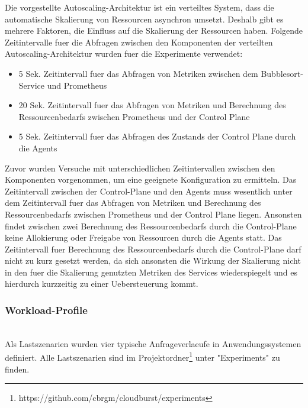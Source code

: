 \documentclass[runningheads]{llncs}
\begin{document}
Die vorgestellte Autoscaling-Architektur ist ein verteiltes System, dass die automatische Skalierung von Ressourcen asynchron umsetzt. Deshalb gibt es mehrere Faktoren, die Einfluss auf die Skalierung der Ressourcen haben. Folgende Zeitintervalle fuer die Abfragen zwischen den Komponenten der verteilten Autoscaling-Architektur wurden fuer die Experimente verwendet: 

 \begin{itemize}
	\item  5 Sek. Zeitintervall fuer das Abfragen von Metriken zwischen dem Bubblesort-Service und Prometheus
	\item  20 Sek. Zeitintervall fuer das Abfragen von Metriken und Berechnung des Ressourcenbedarfs zwischen Prometheus und der Control Plane
	\item  5 Sek. Zeitintervall fuer das Abfragen des Zustands der Control Plane durch die Agents
\end{itemize}

Zuvor wurden Versuche mit unterschiedlichen Zeitintervallen zwischen den Komponenten vorgenommen, um eine geeignete Konfiguration zu ermitteln.
Das Zeitintervall zwischen der Control-Plane und den Agents muss wesentlich unter dem Zeitintervall fuer das Abfragen von Metriken und Berechnung des Ressourcenbedarfs zwischen Prometheus und der Control Plane liegen. Ansonsten findet zwischen zwei Berechnung des Ressourcenbedarfs durch die Control-Plane keine Allokierung oder Freigabe von Ressourcen durch die Agents statt. Das Zeitintervall fuer Berechnung des Ressourcenbedarfs durch die Control-Plane darf nicht zu kurz gesetzt werden, da sich ansonsten die Wirkung der Skalierung nicht in den fuer die Skalierung genutzten Metriken des Services wiederspiegelt und es hierdurch kurzzeitig zu einer Uebersteuerung kommt. \\

\subsubsection{Workload-Profile} \hfill\\

Als Lastszenarien wurden vier typische Anfrageverlaeufe in Anwendungssystemen definiert. Alle Lastszenarien sind im Projektordner\footnote{https://github.com/cbrgm/cloudburst/experiments} unter "Experiments" zu finden.
\end{document}
